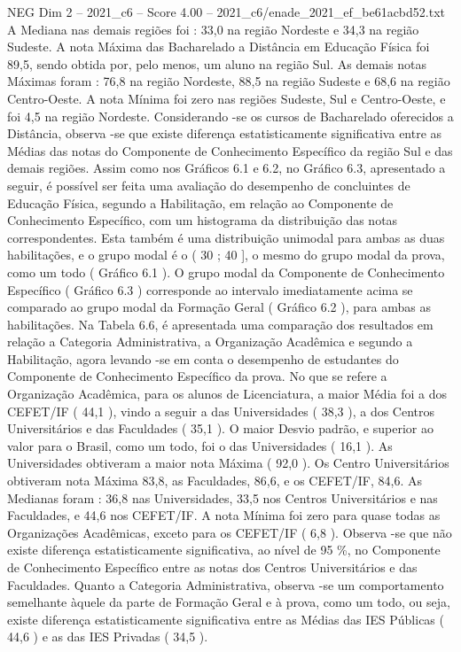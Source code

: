 \begin{textsample}{NEG Dim 2 – 2021\_c6 – Score 4.00 – 2021\_c6/enade\_2021\_ef\_be61acbd52.txt}
A Mediana nas demais regiões foi : 33,0 na região Nordeste e 34,3 na região Sudeste.
A nota Máxima das Bacharelado a Distância em Educação Física foi 89,5, sendo obtida por, pelo menos, um aluno na região Sul.
As demais notas Máximas foram : 76,8 na região Nordeste, 88,5 na região Sudeste e 68,6 na região Centro-Oeste.
A nota Mínima foi zero nas regiões Sudeste, Sul e Centro-Oeste, e foi 4,5 na região Nordeste.
Considerando -se os cursos de Bacharelado oferecidos a Distância, observa -se que existe diferença estatisticamente significativa entre as Médias das notas do Componente de Conhecimento Específico da região Sul e das demais regiões.
Assim como nos Gráficos 6.1 e 6.2, no Gráfico 6.3, apresentado a seguir, é possível ser feita uma avaliação do desempenho de concluintes de Educação Física, segundo a Habilitação, em relação ao Componente de Conhecimento Específico, com um histograma da distribuição das notas correspondentes.
Esta também é uma distribuição unimodal para ambas as duas habilitações, e o grupo modal é o ( 30 ; 40 ], o mesmo do grupo modal da prova, como um todo ( Gráfico 6.1 ).
O grupo modal da Componente de Conhecimento Específico ( Gráfico 6.3 ) corresponde ao intervalo imediatamente acima se comparado ao grupo modal da Formação Geral ( Gráfico 6.2 ), para ambas as habilitações.
Na Tabela 6.6, é apresentada uma comparação dos resultados em relação a Categoria Administrativa, a Organização Acadêmica e segundo a Habilitação, agora levando -se em conta o desempenho de estudantes do Componente de Conhecimento Específico da prova.
No que se refere a Organização Acadêmica, para os alunos de Licenciatura, a maior Média foi a dos CEFET/IF ( 44,1 ), vindo a seguir a das Universidades ( 38,3 ), a dos Centros Universitários e das Faculdades ( 35,1 ).
O maior Desvio padrão, e superior ao valor para o Brasil, como um todo, foi o das Universidades ( 16,1 ).
As Universidades obtiveram a maior nota Máxima ( 92,0 ).
Os Centro Universitários obtiveram nota Máxima 83,8, as Faculdades, 86,6, e os CEFET/IF, 84,6.
As Medianas foram : 36,8 nas Universidades, 33,5 nos Centros Universitários e nas Faculdades, e 44,6 nos CEFET/IF.
A nota Mínima foi zero para quase todas as Organizações Acadêmicas, exceto para os CEFET/IF ( 6,8 ).
Observa -se que não existe diferença estatisticamente significativa, ao nível de 95 \%, no Componente de Conhecimento Específico entre as notas dos Centros Universitários e das Faculdades.
Quanto a Categoria Administrativa, observa -se um comportamento semelhante àquele da parte de Formação Geral e à prova, como um todo, ou seja, existe diferença estatisticamente significativa entre as Médias das IES Públicas ( 44,6 ) e as das IES Privadas ( 34,5 ).

\end{textsample}
